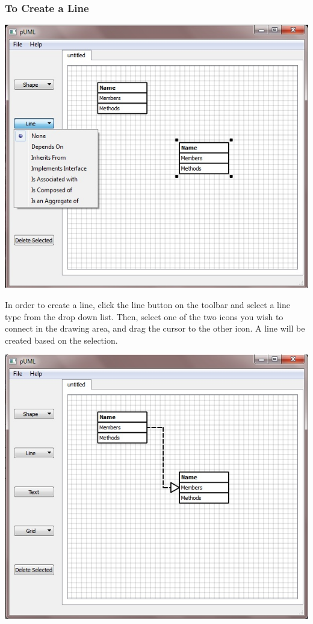 \documentclass[]{article}
\begin{document}
\subsubsection{To Create a Line}
{\color{black}
\includegraphics[scale = .50]{ChoosingLine}

In order to create a line, click the line button on the toolbar and select a line type from the drop down list. Then, select one of the two icons you wish to connect in the drawing area, and drag the cursor to the other icon. A line will be created based on the selection. 

\includegraphics[scale = .45]{CreatedLine}
}
\end{document}
